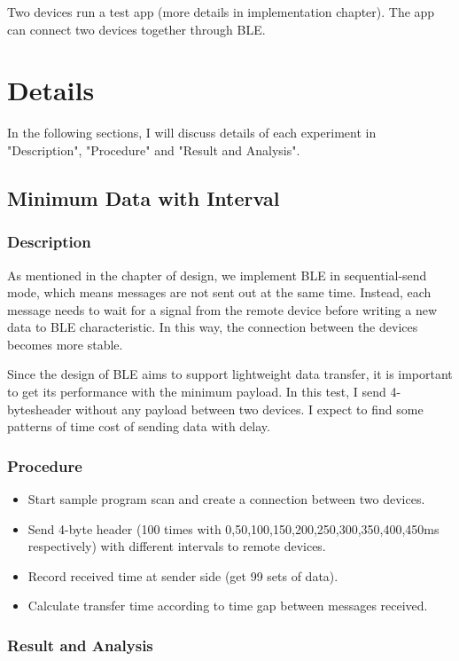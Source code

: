 \documentclass{Nan_Thesis}
\begin{document}
Two devices run a test app (more details in implementation chapter). The app can connect two devices together through BLE. 
\section{Details}
In the following sections, I will discuss details of each experiment in "Description", "Procedure" and "Result and Analysis".
\subsection{Minimum Data with Interval}
\subsubsection{Description}
As mentioned in the chapter of design, we implement BLE in sequential-send mode, which means messages are not sent out at the same time. Instead, each message needs to wait for a signal from the remote device before writing a new data to BLE characteristic. In this way, the connection between the devices becomes more stable.

Since the design of BLE aims to support lightweight data transfer, it is important to get its performance with the minimum payload. In this test, I send 4-bytesheader without any payload between two devices. I expect to find some patterns of time cost of sending data with delay. 
\subsubsection{Procedure}

\begin{itemize}
  \item Start sample program scan and create a connection between two devices.
  \item Send 4-byte header (100 times with 0,50,100,150,200,250,300,350,400,450ms respectively) with different intervals to remote devices.
  \item Record received time at sender side (get 99 sets of data). 
  \item Calculate transfer time according to time gap between messages received.
\end{itemize}

\subsubsection{Result and Analysis}
\end{document}
